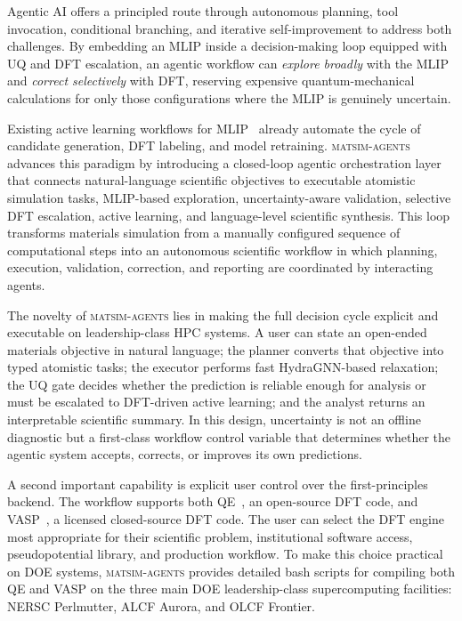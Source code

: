 \documentclass[conference]{IEEEtran}
\def\ac#1{#1}%
\def\acs#1{#1}%
\def\acp#1{#1}%
\begin{document}
Agentic \acs{AI} offers a principled route through autonomous planning, tool invocation,
conditional branching, and iterative self-improvement to address both challenges. By embedding an \ac{MLIP} inside a decision-making
loop equipped with \ac{UQ} and \acs{DFT} escalation, an
agentic workflow can \emph{explore broadly} with the \acs{MLIP} and \emph{correct
selectively} with \acs{DFT}, reserving expensive quantum-mechanical calculations for
only those configurations where the \acs{MLIP} is genuinely uncertain.

Existing active learning workflows for \acp{MLIP}~\cite{smith2018,vandermause2020,
podryabinkin2017} already automate the cycle of candidate generation, \acs{DFT}
labeling, and model retraining. \textsc{matsim-agents} advances this paradigm
by introducing a closed-loop agentic orchestration layer that connects
natural-language scientific objectives to executable atomistic simulation tasks,
\acs{MLIP}-based exploration, uncertainty-aware validation, selective \acs{DFT} escalation,
active learning, and language-level scientific synthesis. This loop transforms
materials simulation from a manually configured sequence of computational steps
into an autonomous scientific workflow in which planning, execution,
validation, correction, and reporting are coordinated by interacting agents.

The novelty of \textsc{matsim-agents} lies in making the full decision cycle
explicit and executable on leadership-class \acs{HPC} systems. A user can state an
open-ended materials objective in natural language; the planner converts that
objective into typed atomistic tasks; the executor performs fast HydraGNN-based
relaxation; the \acs{UQ} gate decides whether the prediction is reliable enough for
analysis or must be escalated to \ac{DFT}-driven active learning; and the analyst
returns an interpretable scientific summary. In this design, uncertainty is not
an offline diagnostic but a first-class workflow control variable that determines
whether the agentic system accepts, corrects, or improves its own predictions.

A second important capability is explicit user control over the first-principles
backend. The workflow supports both \ac{QE}~\cite{giannozzi2009qe,giannozzi2017qe}, an open-source \acs{DFT}
code, and \ac{VASP}~\cite{kresse1993vasp,kresse1996vasp}, a licensed closed-source \acs{DFT} code. The user can select the \acs{DFT}
engine most appropriate for their scientific problem, institutional software
access, pseudopotential library, and production workflow. To make this choice
practical on \acs{DOE} systems, \textsc{matsim-agents} provides detailed bash scripts
for compiling both \acs{QE} and \acs{VASP} on the three main \ac{DOE} leadership-class
supercomputing facilities: \ac{NERSC} Perlmutter, \ac{ALCF} Aurora, and \ac{OLCF} Frontier.
\end{document}
